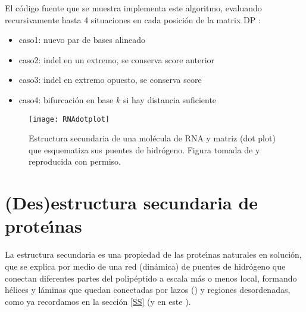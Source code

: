 El c\'{o}digo fuente que se muestra implementa este algoritmo, 
evaluando recursivamente hasta 4 situaciones en cada posici\'{o}n de la matrix DP \citep{Eddy2004b}:
\begin{itemize}
\item caso1: nuevo par de bases alineado
\item caso2: indel en un extremo, se conserva score anterior
\item caso3: indel en extremo opuesto, se conserva score
\item caso4: bifurcaci\'{o}n en base $k$ si hay distancia suficiente 
\end{itemize}




\begin{figure}
\begin{center} 
\texttt{[image: RNAdotplot]}
\caption
{
Estructura secundaria de una mol\'{e}cula de RNA y matriz (dot plot) que esquematiza sus puentes de hidr\'{o}geno.
Figura tomada de \cite{Bernhart2006} y reproducida con permiso. 
}
\label{fig:RNAdotplot}
\end{center}
\end{figure}
\section{(Des)estructura secundaria de prote\'\i{}nas} \label{protSS}

La estructura secundaria es una propiedad de las prote\'\i{}nas naturales en soluci\'{o}n, 
que se explica por medio de una red (din\'{a}mica) de puentes de hidr\'{o}geno que conectan diferentes partes del polip\'{e}ptido 
a escala m\'{a}s o menos local, formando h\'{e}lices y l\'{a}minas que quedan conectadas por lazos () y regiones 
desordenadas, como ya recordamos en la secci\'{o}n \ref{SS} 
(y en este ). 

